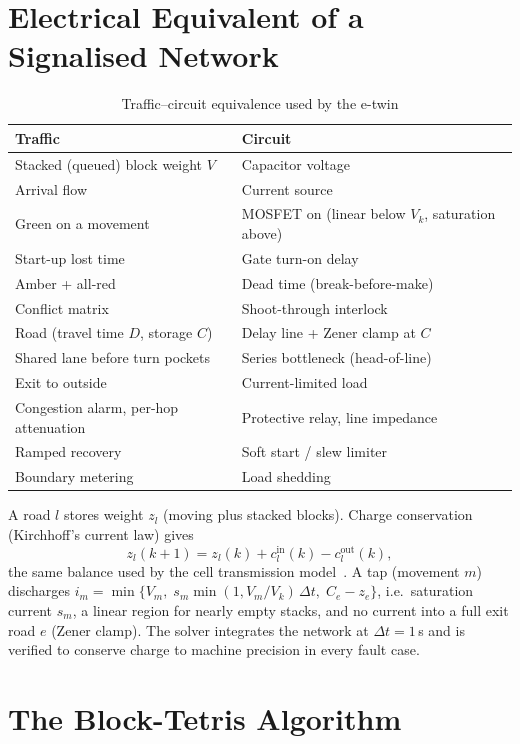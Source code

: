 \documentclass[journal]{IEEEtran}
\begin{document}
\section{Electrical Equivalent of a Signalised Network}
\begin{table}[t]
\caption{Traffic--circuit equivalence used by the e-twin}
\label{tab:equiv}
\centering\small
\begin{tabular}{@{}ll@{}}
\toprule
Traffic & Circuit\\
\midrule
Stacked (queued) block weight $V$ & Capacitor voltage\\
Arrival flow & Current source\\
Green on a movement & MOSFET on (linear below $V_k$, saturation above)\\
Start-up lost time & Gate turn-on delay\\
Amber + all-red & Dead time (break-before-make)\\
Conflict matrix & Shoot-through interlock\\
Road (travel time $D$, storage $C$) & Delay line + Zener clamp at $C$\\
Shared lane before turn pockets & Series bottleneck (head-of-line)\\
Exit to outside & Current-limited load\\
Congestion alarm, per-hop attenuation & Protective relay, line impedance\\
Ramped recovery & Soft start / slew limiter\\
Boundary metering & Load shedding\\
\bottomrule
\end{tabular}
\end{table}
A road $l$ stores weight $z_l$ (moving plus stacked blocks). Charge conservation
(Kirchhoff's current law) gives
\begin{equation}
z_l(k+1)=z_l(k)+c^{\mathrm{in}}_l(k)-c^{\mathrm{out}}_l(k),
\label{eq:kcl}
\end{equation}
the same balance used by the cell transmission model~\cite{daganzo1994ctm}. A tap
(movement $m$) discharges $i_m=\min\{V_m,\; s_m\min(1,V_m/V_k)\,\Delta t,\;
C_e-z_e\}$, i.e.\ saturation current $s_m$, a linear region for nearly empty
stacks, and no current into a full exit road $e$ (Zener clamp). The solver integrates
the network at $\Delta t=1$\,s and is verified to conserve charge to machine
precision in every fault case.

\section{The Block-Tetris Algorithm}
\end{document}
